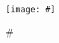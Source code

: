 \begin{figure}[H]
    \centering
    \texttt{[image: \#]}
    \caption{#}
    \label{fig:#}
\end{figure}
